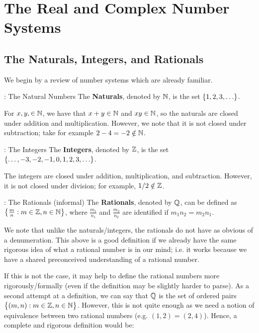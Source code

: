 \section{The Real and Complex Number Systems}
\subsection{The Naturals, Integers, and Rationals}
We begin by a review of number systems which are already familiar.

\begin{ndef}{: The Natural Numbers}
    The \textbf{Naturals}, denoted by $\mathbb{N}$, is the set $\set{1, 2, 3, \ldots}$.
\end{ndef}

\noindent For $x, y, \in \mathbb{N}$, we have that $x + y \in \mathbb{N}$ and $xy \in \mathbb{N}$, so the naturals are closed under addition and multiplication. However, we note that it is not closed under subtraction; take for example $2 - 4 = -2 \notin \mathbb{N}$.

\begin{ndef}{: The Integers}
    The \textbf{Integers}, denoted by $\mathbb{Z}$, is the set $\set{\ldots, -3, -2, -1, 0, 1, 2, 3, \ldots}$.
\end{ndef}

\noindent The integers are closed under addition, multiplication, and subtraction. However, it is not closed under division; for example, $1/2 \notin \mathbb{Z}$. 

\begin{ndef}{: The Rationals (informal)}
    The \textbf{Rationals}, denoted by $\mathbb{Q}$, can be defined as $\set{\frac{m}{n}: m \in \mathbb{Z}, n \in \mathbb{N}}$, where $\frac{m_1}{n_1}$ and $\frac{m_2}{n_2}$ are identified if $m_1n_2 = m_2n_1$.
\end{ndef}

\noindent We note that unlike the naturals/integers, the rationals do not have as obvious of a denumeration. This above is a good definition if we already have the same rigorous idea of what a rational number is in our mind; i.e. it works because we have a shared preconceived understanding of a rational number.

If this is not the case, it may help to define the rational numbers more rigorously/formally (even if the definition may be slightly harder to parse). As a second attempt at a definition, we can say that $\mathbb{Q}$ is the set of ordered pairs $\set{(m, n): m \in \mathbb{Z}, n \in \mathbb{N}}$. However, this is not quite enough as we need a notion of equivalence between two rational numbers (e.g. $(1, 2) = (2, 4)$). Hence, a complete and rigorous definition would be:

